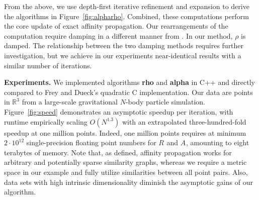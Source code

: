 \documentclass{article}
\newcommand{\killspace}{\vspace{-0.08in}}
\newcommand{\respo}[2]{R_{#1#2}}
\newcommand{\avail}[2]{A_{#1#2}}
\newcommand{\vecrho}{\vec{\rho}}
\newcommand{\vecalpha}{\vec{\alpha}}
\begin{document}
\killspace
From the above, we use depth-first iterative refinement and expansion to derive the algorithms in Figure~\ref{fig:alpharho}.
Combined, these computations perform the core update of exact affinity propagation.
Our rearrangements of the computation require damping in a different manner from \cite{affinity}.
In our method, $\rho$ is damped.
The relationship between the two damping methods requires further investigation, but we achieve in our experiments near-identical results with a similar number of iterations.

{\bf Experiments.} We implemented algorithms {\bf rho} and {\bf alpha} in C++ and directly compared to Frey and Dueck's quadratic C implementation.
Our data are points in $\mathbb{R}^3$ from a large-scale gravitational $N$-body particle simulation.
Figure~\ref{fig:speed} demonstrates an asymptotic speedup per iteration, with runtime empirically scaling $O(N^{1.3})$ with an extrapolated three-hundred-fold speedup at one million points.
Indeed, one million points requires at minimum $2 \cdot 10^{12}$ single-precision floating point numbers for $\respo{}{}$ and $\avail{}{}$, amounting to eight terabytes of memory.
Note that, as defined, affinity propagation works for arbitrary and potentially sparse similarity graphs, whereas we require a metric space in our example and fully utilize similarities between all point pairs.
Also, data sets with high intrinsic dimensionality diminish the asymptotic gains of our algorithm.
\end{document}
